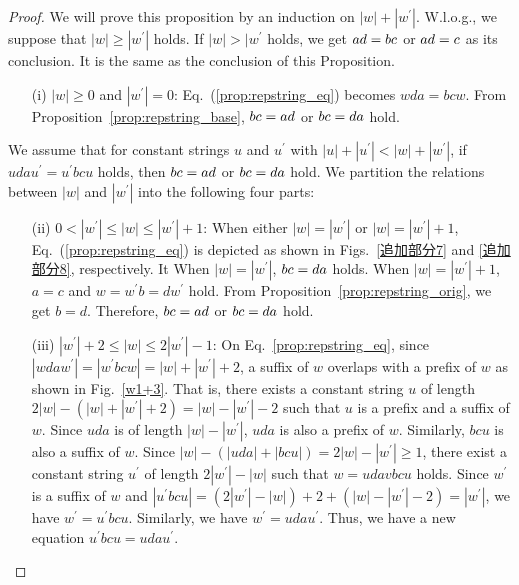 \begin{proof}
We will prove this proposition by an induction on $|w| + |w^{\prime}|$.
W.l.o.g., we suppose that $|w| \geq |w^{\prime}|$ holds.
If $|w| > |w^{\prime}$ holds, we get $ad = bc$ or $ad = c$ as its conclusion. It is the same as the conclusion of this Proposition.
\begin{enumerate}
  \item[(i)] $|w| \geq 0$ and $|w^{\prime}|=0$:
  Eq.~(\ref{prop:repstring_eq}) becomes $wda = bcw$. From Proposition~\ref{prop:repstring_base}, $bc = ad$ or $bc = da$ hold.
\end{enumerate}
We assume that for constant strings $u$ and $u^{\prime}$ with $|u| + |u^{\prime}| < |w| + |w^{\prime}|$, if $udau^{\prime} = u^{\prime}bcu$ holds, then $bc = ad$ or $bc = da$ hold.
We partition the relations between $|w|$ and $|w^{\prime}|$ into the following four parts:
\begin{enumerate}
\item[(ii)] $0 < |w^{\prime}| \le |w| \le |w^{\prime}|+1$:
When either $|w|=|w^{\prime}|$ or $|w|=|w^{\prime}|+1$, Eq.~(\ref{prop:repstring_eq}) is depicted as shown in Figs.~\ref{追加部分7} and \ref{追加部分8}, respectively.
It When $|w|=|w^{\prime}|$, $bc = da$ holds. When $|w|=|w^{\prime}|+1$, $a = c$ and $w = w^{\prime}b = dw^{\prime}$ hold.
From Proposition~\ref{prop:repstring_orig}, we get $b = d$.
Therefore, $bc = ad$ or $bc = da$ hold.
%
\item[(iii)] $|w^{\prime}|+2 \le |w| \le 2|w^{\prime}| - 1$:
On Eq.~\ref{prop:repstring_eq}, since $|wdaw^{\prime}| = |w^{\prime}bcw| = |w| + |w^{\prime}| + 2$, a suffix of $w$ overlaps with a prefix of $w$ as shown in Fig.~\ref{w1+3}.
That is, there exists a constant string $u$ of length $2|w| - (|w| + |w^{\prime}| + 2) = |w| - |w^{\prime}| - 2$ such that $u$ is a prefix and a suffix of $w$.
Since $uda$ is of length $|w| - |w^{\prime}|$, $uda$ is also a prefix of $w$. Similarly, $bcu$ is also a suffix of $w$.
Since $|w| - (|uda| + |bcu|) = 2|w| - |w^{\prime}| \ge 1$, there exist a constant string $u^{\prime}$ of length $2|w^{\prime}| - |w|$ such that $w = udavbcu$ holds.
Since $w^{\prime}$ is a suffix of $w$ and $|u^{\prime}bcu| = (2|w^{\prime}| - |w|) + 2 + (|w| - |w^{\prime}| - 2) = |w^{\prime}|$, we have $w^{\prime} = u^{\prime}bcu$.
Similarly, we have $w^{\prime} = udau^{\prime}$. Thus, we have a new equation $u^{\prime}bcu = udau^{\prime}$.

\end{enumerate}
\end{proof}
